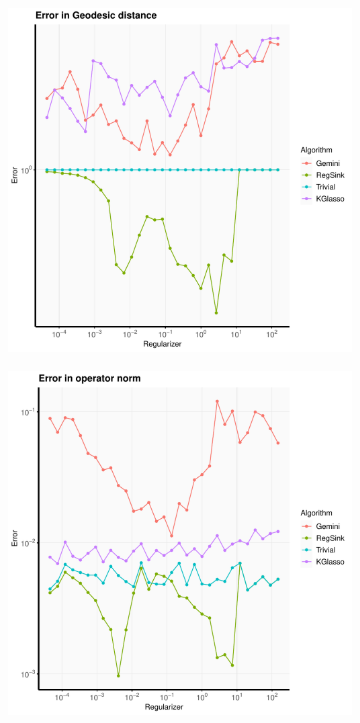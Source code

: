 \documentclass[aos]{imsart}
\theoremstyle{definition}
\numberwithin{equation}{section}
\begin{document}
\begin{figure}
     \centering
     \begin{subfigure}[b]{0.3\textwidth}
         \centering
         \includegraphics[width=\textwidth]{./code/zhou-comparison/25-50-spiked-geo.pdf}
     \end{subfigure}
     \hfill
     \begin{subfigure}[b]{0.3\textwidth}
         \centering
         \includegraphics[width=\textwidth]{./code/zhou-comparison/25-50-spiked-op.pdf}

\end{subfigure}
\end{figure}
\end{document}
